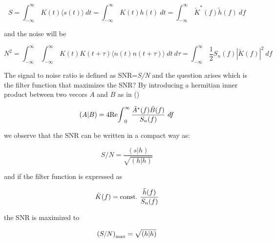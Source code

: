 \documentclass[epsf]{article}
\begin{document}
\begin{equation}
S = {\int}_{-{\infty}}^{\infty}\, K(t) \langle s(t) \rangle ~dt = {\int}_{-{\infty}}^{\infty}\, K(t) h(t) ~dt = {\int}_{-{\infty}}^{\infty}\, \tilde K^*(f) \tilde h(f)~df
\end{equation}

and the noise will be

\begin{equation}
N^2 = {\int}_{-{\infty}}^{\infty}\,{\int}_{-{\infty}}^{\infty}\, K(t)K(t+ \tau) \langle n(t)n(t+ \tau) \rangle ~dt ~d \tau = {\int}_{-{\infty}}^{\infty}\, \frac {1}{2} S_n(f) {|\tilde K(f)|}^2~df
\end{equation}

The signal to noise ratio is defined as SNR={\it S/N} and the question arises which is the filter function that maximizes the SNR? By introducing a hermitian inner product between two vecors $A$ and $B$ as in (\cite{allen,maggiore}) 

\begin{equation}
(A|B) = 4 {\rm Re} {\int}_0^{\infty}\, \frac {\tilde A^*(f) \tilde B(f)}{S_n(f)}~df
\end{equation}

we observe that the SNR can be written in a compact way as:

\begin{equation}
S/N = \frac {(s|h)}{\sqrt {(h|h)}}
\end{equation}

and if the filter function is expressed as

\begin{equation}
\tilde K(f) = {\rm const.}~\frac {\tilde h(f)}{S_n(f)}
\end{equation}

the SNR is maximized to 

\begin{equation}
{(S/N)}_{\rm {max}} = \sqrt {(h|h)}
\end{equation}
\end{document}
